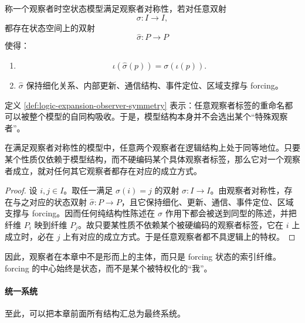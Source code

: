 \begin{definition}[观察者对称性]\label{def:logic-expansion-observer-symmetry}
称一个观察者时空状态模型满足观察者对称性，若对任意双射
\[
\sigma:I\to I,
\]
都存在状态空间上的双射
\[
\widehat{\sigma}:P\to P
\]
使得：
\begin{enumerate}
  \item
  \[
  \iota(\widehat{\sigma}(p))=\sigma(\iota(p)).
  \]
  \item \(\widehat{\sigma}\) 保持细化关系、内部更新、通信结构、事件定位、区域支撑与 forcing。
\end{enumerate}
\end{definition}

定义 \ref{def:logic-expansion-observer-symmetry} 表示：任意观察者标签的重命名都可以被整个模型的自同构吸收。于是，模型结构本身并不会选出某个“特殊观察者”。

\begin{proposition}[无特权观察者]\label{prop:logic-expansion-no-privileged-observer}
在满足观察者对称性的模型中，任意两个观察者在逻辑结构上处于同等地位。只要某个性质仅依赖于模型结构，而不硬编码某个具体观察者标签，那么它对一个观察者成立，就对任何其它观察者都存在对应的成立方式。
\end{proposition}

\begin{proof}
设 \(i,j\in I\)。取任一满足 \(\sigma(i)=j\) 的双射 \(\sigma:I\to I\)。由观察者对称性，存在与之对应的状态双射 \(\widehat{\sigma}:P\to P\)，且它保持细化、更新、通信、事件定位、区域支撑与 forcing。因而任何纯结构性陈述在 \(\widehat{\sigma}\) 作用下都会被送到同型的陈述，并把纤维 \(P_i\) 映到纤维 \(P_j\)。故只要某性质不依赖某个被硬编码的观察者标签，它在 \(i\) 上成立时，必在 \(j\) 上有对应的成立方式。于是任意观察者都不具逻辑上的特权。
\end{proof}

因此，观察者在本章中不是形而上的主体，而只是 forcing 状态的索引纤维。forcing 的中心始终是状态，而不是某个被特权化的“我”。

\paragraph{统一系统}
至此，可以把本章前面所有结构汇总为最终系统。

